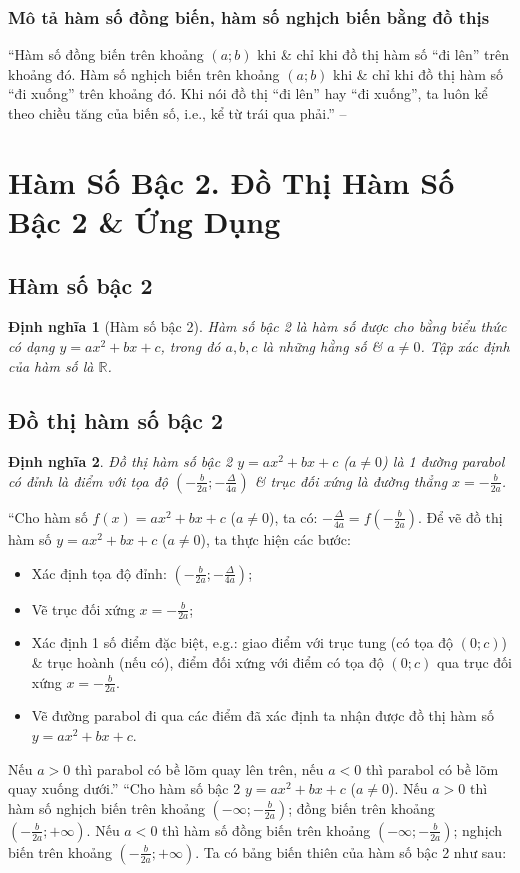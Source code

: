 \documentclass[oneside]{book}
\numberwithin{equation}{section}
\newtheorem{dinhnghia}{Định nghĩa}[section]
\begin{document}
\subsubsection{Mô tả hàm số đồng biến, hàm số nghịch biến bằng đồ thịs}
``Hàm số đồng biến trên khoảng $(a;b)$ khi \& chỉ khi đồ thị hàm số ``đi lên'' trên khoảng đó. Hàm số nghịch biến trên khoảng $(a;b)$ khi \& chỉ khi đồ thị hàm số ``đi xuống'' trên khoảng đó. Khi nói đồ thị ``đi lên'' hay ``đi xuống'', ta luôn kể theo chiều tăng của biến số, i.e., kể từ trái qua phải.'' -- \cite[p. 37]{SGK_Toan_10_Canh_Dieu_tap_1}

\section{Hàm Số Bậc 2. Đồ Thị Hàm Số Bậc 2 \& Ứng Dụng}

\subsection{Hàm số bậc 2}

\begin{dinhnghia}[Hàm số bậc 2]
	\emph{Hàm số bậc 2} là hàm số được cho bằng biểu thức có dạng $y = ax^2 + bx + c$, trong đó $a,b,c$ là những hằng số \& $a\ne 0$. Tập xác định của hàm số là $\mathbb{R}$.
\end{dinhnghia}

\subsection{Đồ thị hàm số bậc 2}

\begin{dinhnghia}
	\emph{Đồ thị hàm số bậc 2 $y = ax^2 + bx + c$} ($a\ne 0$) là 1 đường parabol có đỉnh là điểm với tọa độ $\left(-\frac{b}{2a};-\frac{\Delta}{4a}\right)$ \& trục đối xứng là đường thẳng $x = -\frac{b}{2a}$.
\end{dinhnghia}
``Cho hàm số $f(x) = ax^2 + bx + c$ ($a\ne 0$), ta có: $-\frac{\Delta}{4a} = f\left(-\frac{b}{2a}\right)$. Để vẽ đồ thị hàm số $y = ax^2 + bx + c$ ($a\ne 0$), ta thực hiện các bước:
\begin{itemize}
	\item Xác định tọa độ đỉnh: $\left(-\frac{b}{2a};-\frac{\Delta}{4a}\right)$;
	\item Vẽ trục đối xứng $x = -\frac{b}{2a}$;
	\item Xác định 1 số điểm đặc biệt, e.g.: giao điểm với trục tung (có tọa độ $(0;c)$) \& trục hoành (nếu có), điểm đối xứng với điểm có tọa độ $(0;c)$ qua trục đối xứng $x = -\frac{b}{2a}$.
	\item Vẽ đường parabol đi qua các điểm đã xác định ta nhận được đồ thị hàm số $y = ax^2 + bx + c$.
\end{itemize}
Nếu $a > 0$ thì parabol có bề lõm quay lên trên, nếu $a < 0$ thì parabol có bề lõm quay xuống dưới.'' ``Cho hàm số bậc 2 $y = ax^2 + bx + c$ ($a\ne 0$). Nếu $a > 0$ thì hàm số nghịch biến trên khoảng $\left(-\infty;-\frac{b}{2a}\right)$; đồng biến trên khoảng $\left(-\frac{b}{2a};+\infty\right)$. Nếu $a < 0$ thì hàm số đồng biến trên khoảng $\left(-\infty;-\frac{b}{2a}\right)$; nghịch biến trên khoảng $\left(-\frac{b}{2a};+\infty\right)$. Ta có bảng biến thiên của hàm số bậc 2 như sau:
\end{document}
